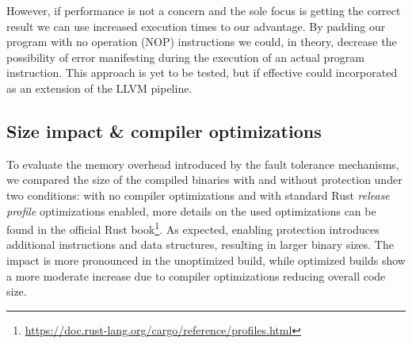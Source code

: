 However, if performance is not a concern and the sole focus is getting the correct result we can use increased execution times to our advantage. By padding our program with no operation (NOP) instructions we could, in theory, decrease the possibility of error manifesting during the execution of an actual program instruction. This approach is yet to be tested, but if effective could incorporated as an extension of the LLVM pipeline. 





\subsection{Size impact \& compiler optimizations}

To evaluate the memory overhead introduced by the fault tolerance mechanisms, we compared the size of the compiled binaries with and without protection under two conditions: with no compiler optimizations and with standard Rust \textit{release profile} optimizations enabled, more details on the used optimizations can be found in the official Rust book\footnote{\url{https://doc.rust-lang.org/cargo/reference/profiles.html}}. As expected, enabling protection introduces additional instructions and data structures, resulting in larger binary sizes. The impact is more pronounced in the unoptimized build, while optimized builds show a more moderate increase due to compiler optimizations reducing overall code size.

